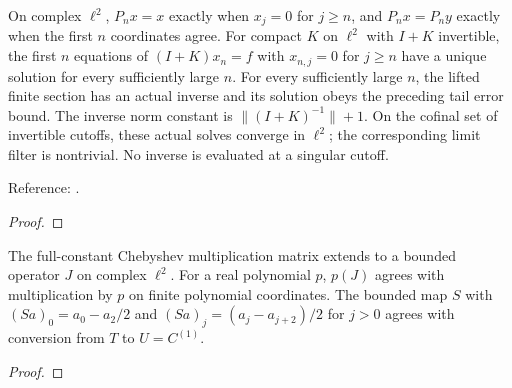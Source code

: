 \begin{supporting}
\begin{theorem}
\label{thm:lp-finite-systems}
\leanok
On complex $\ell^2$, $P_nx=x$ exactly when $x_j=0$ for $j\ge n$, and
$P_nx=P_ny$ exactly when the first $n$ coordinates agree.
For compact $K$ on $\ell^2$ with $I+K$ invertible, the first $n$ equations of $(I+K)x_n=f$ with $x_{n,j}=0$ for $j\ge n$ have a unique solution for every sufficiently large $n$. For every sufficiently large $n$, the lifted finite section has an actual
inverse and its solution obeys the preceding tail error bound. The inverse norm
constant is $\|(I+K)^{-1}\|+1$. On the cofinal set of invertible cutoffs,
these actual solves converge in $\ell^2$; the corresponding limit filter is
nontrivial. No inverse is evaluated at a singular cutoff.

Reference: \cite[Section 4.2]{olver-townsend}.
\end{theorem}
\begin{proof}
\leanok
\end{proof}

\begin{theorem}
\label{thm:bounded-chebyshev-operators}
\leanok
The full-constant Chebyshev multiplication matrix extends to a bounded operator $J$ on complex $\ell^2$. For a real polynomial $p$, $p(J)$ agrees with multiplication by $p$ on finite polynomial coordinates. The bounded map $S$ with $(Sa)_0=a_0-a_2/2$ and $(Sa)_j=(a_j-a_{j+2})/2$ for $j>0$ agrees with conversion from $T$ to $U=C^{(1)}$.
\end{theorem}
\begin{proof}
\leanok
\end{proof}


\end{supporting}
